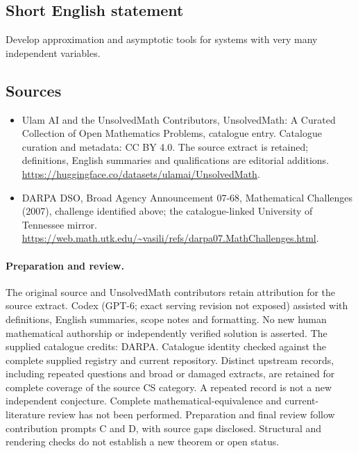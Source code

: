 \documentclass[11pt]{article}
\begin{document}
\subsection{Short English statement}
Develop approximation and asymptotic tools for systems with very many independent variables.
\subsection{Sources}
\begin{itemize}
\item[\hypertarget{source:statement:1}{S1}] Ulam AI and the UnsolvedMath Contributors, UnsolvedMath: A Curated Collection of Open Mathematics Problems, catalogue entry. Catalogue curation and metadata: CC BY 4.0. The source extract is retained; definitions, English summaries and qualifications are editorial additions.
\url{https://huggingface.co/datasets/ulamai/UnsolvedMath}.
\item[\hypertarget{source:statement:2}{S2}] DARPA DSO, Broad Agency Announcement 07-68, Mathematical Challenges (2007), challenge identified above; the catalogue-linked University of Tennessee mirror.
\url{https://web.math.utk.edu/~vasili/refs/darpa07.MathChallenges.html}.
\end{itemize}
\paragraph{Preparation and review.}
The original source and UnsolvedMath contributors retain attribution for the source extract. Codex (GPT-6; exact serving revision not exposed) assisted with definitions, English summaries, scope notes and formatting. No new human mathematical authorship or independently verified solution is asserted. The supplied catalogue credits: DARPA. Catalogue identity checked against the complete supplied registry and current repository. Distinct upstream records, including repeated questions and broad or damaged extracts, are retained for complete coverage of the source CS category. A repeated record is not a new independent conjecture. Complete mathematical-equivalence and current-literature review has not been performed. Preparation and final review follow contribution prompts C and D, with source gaps disclosed. Structural and rendering checks do not establish a new theorem or open status.
\label{end:statement}
\end{document}
